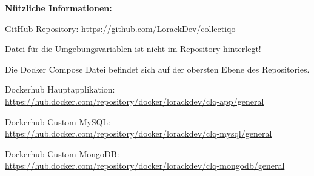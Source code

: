 \textbf{Nützliche Informationen:}\par
\vspace{0.5cm}
GitHub Repository: \url{https://github.com/LorackDev/collectiqo}\par
Datei für die Umgebungsvariablen ist nicht im Repository hinterlegt!\par
Die Docker Compose Datei befindet sich auf der obersten Ebene des Repositories.\par

\vspace{0.5cm}
Dockerhub Hauptapplikation: \url{https://hub.docker.com/repository/docker/lorackdev/clq-app/general}\par
Dockerhub Custom MySQL: \url{https://hub.docker.com/repository/docker/lorackdev/clq-mysql/general}\par
Dockerhub Custom MongoDB: \url{https://hub.docker.com/repository/docker/lorackdev/clq-mongodb/general}\par

